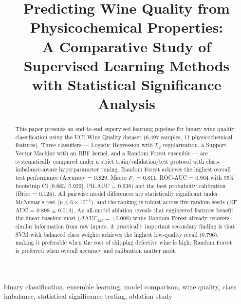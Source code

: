 \documentclass[conference]{IEEEtran}
\begin{document}
\title{Predicting Wine Quality from Physicochemical Properties:\\
A Comparative Study of Supervised Learning Methods\\
with Statistical Significance Analysis}

\author{
}

\maketitle

\begin{abstract}
This paper presents an end-to-end supervised learning pipeline for binary
wine quality classification using the UCI Wine Quality dataset
(6{,}497 samples, 11 physicochemical features). Three classifiers ---
Logistic Regression with $L_2$ regularization, a Support Vector Machine
with an RBF kernel, and a Random Forest ensemble --- are systematically
compared under a strict train/validation/test protocol with
class-imbalance-aware hyperparameter tuning. Random Forest achieves the
highest overall test performance (Accuracy = 0.829, Macro $F_1$ = 0.811,
ROC-AUC = 0.904 with 95\% bootstrap CI [0.883, 0.922], PR-AUC = 0.938)
and the best probability calibration (Brier = 0.124). All pairwise
model differences are statistically significant under McNemar's test
($p \le 6 \times 10^{-4}$), and the ranking is robust across five
random seeds (RF AUC = 0.898 $\pm$ 0.013). An all-model ablation reveals
that engineered features benefit the linear baseline most
($\Delta\text{AUC}_{\text{LR}} = +0.008$) while Random Forest already
recovers similar information from raw inputs. A practically important
secondary finding is that SVM with balanced class weights achieves the
highest low-quality recall (0.796), making it preferable when the cost
of shipping defective wine is high; Random Forest is preferred when
overall accuracy and calibration matter most.
\end{abstract}

\begin{IEEEkeywords}
binary classification, ensemble learning, model comparison, wine
quality, class imbalance, statistical significance testing, ablation
study
\end{IEEEkeywords}
\end{document}
